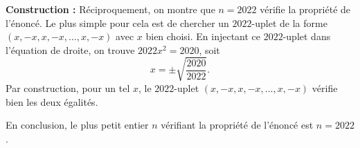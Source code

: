 \bigskip

\textbf{Construction :}
Réciproquement, on montre que $n=2022$ vérifie la propriété de l'énoncé. Le plus simple pour cela est de chercher un
$2022$-uplet de la forme $(x,-x,x,-x, \ldots , x, -x)$ avec $x$ bien choisi. En injectant ce $2022$-uplet
dans l'équation de droite, on trouve $2022x^2=2020$, soit
$$x = \pm\sqrt{\dfrac{2020}{2022}}.$$
Par construction, pour un tel $x$, le $2022$-uplet
$(x,-x,x,-x, \ldots , x, -x)$ vérifie bien les deux égalités.

\bigskip

En conclusion, le plus petit entier $n$ vérifiant la propriété de l'énoncé est $n=2022$.